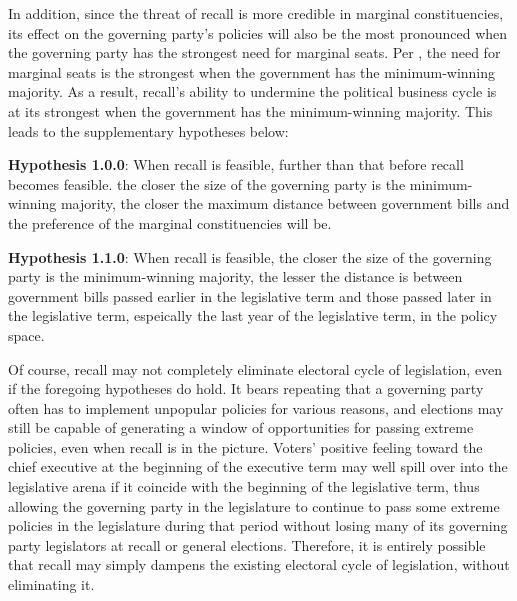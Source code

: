 \documentclass{article}
\begin{document}
		
		In addition,
		since
		the threat of recall is more credible in marginal constituencies,
		its effect on the governing party's policies
		will also be the most pronounced when the governing party
		has the strongest need for marginal seats.
		Per
		\citeauthor{stroblElectoralCyclesGovernment2021}
		\autocite*{stroblElectoralCyclesGovernment2021},
		the need for marginal seats is the strongest
		when the government has the minimum-winning majority.
		As a result, recall's ability to undermine the political business cycle
		is at its strongest when the government has the minimum-winning majority.
		This leads to the supplementary hypotheses below:
		
		\textbf{Hypothesis 1.0.0}: When recall is feasible,
		further than that before recall becomes feasible.
		the closer the size of the governing party is the minimum-winning majority,
		the closer
		the maximum distance between government bills
		and the preference of the marginal constituencies will be.
		
		\textbf{Hypothesis 1.1.0}: When recall is feasible,
		the closer the size of the governing party is the minimum-winning majority,
		the lesser the distance is between government bills passed earlier in the legislative term
		and those passed later in the legislative term,
		espeically the last year of the legislative term,
		in the policy space.
		
		Of course,
		recall may not completely eliminate electoral cycle of legislation,
		even if
		the foregoing hypotheses do hold.
		It bears repeating that a governing party
		often has to implement unpopular policies for various reasons,
		and elections may still be capable of generating
		a window of opportunities for passing extreme policies,
		even when recall is in the picture.
		Voters' positive feeling toward the chief executive
		at the beginning of the executive term
		\autocite{beckmannPolicyOpportunitiesPresidential2007,
			bondMarginalTimeVaryingEffect2003,
			castrocornejoElectionDayPresidential2022,
			dewanDynamicGovernmentPerformance2012,
			elgieProximityCandidatesPresidential2014}
		may well spill over into the legislative arena
		if it
		coincide with the beginning of the legislative term,
		thus allowing the governing party in the legislature
		to continue to pass some extreme policies in the legislature during that period
		without losing many of its governing party legislators
		at recall or general elections.
		Therefore, it is entirely possible that
		recall
		may simply dampens the existing electoral cycle of legislation,
		without eliminating it.
		
\end{document}
